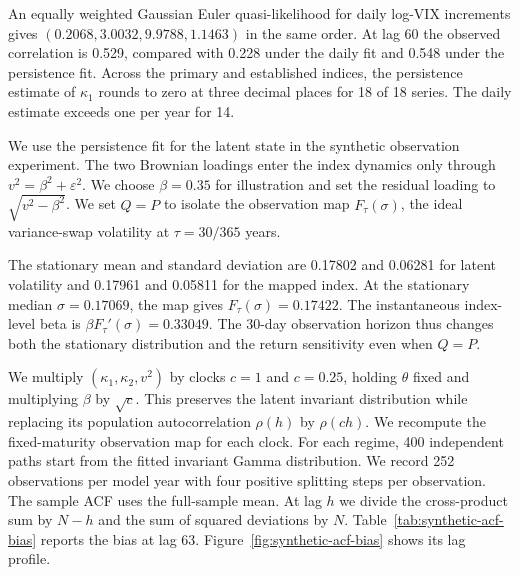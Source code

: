 An equally weighted Gaussian Euler quasi-likelihood for daily log-VIX increments
gives $(0.2068,3.0032,9.9788,1.1463)$ in the same order.
At lag 60 the observed correlation is 0.529, compared with 0.228
under the daily fit and 0.548 under the persistence fit.
Across the primary and established indices, the persistence estimate of $\kappa_1$ rounds to zero
at three decimal places for 18 of 18 series. The daily estimate exceeds one per year for 14.

We use the persistence fit for the latent state in the synthetic observation experiment.
The two Brownian loadings enter the index dynamics only through $v^2=\beta^2+\varepsilon^2$. We choose $\beta=0.35$
for illustration and set the residual loading to $\sqrt{v^2-\beta^2}$.
We set $Q=P$ to isolate the observation map $F_\tau(\sigma)$, the ideal
variance-swap volatility at $\tau=30/365$ years.

The stationary mean and standard deviation are 0.17802
and 0.06281 for latent volatility and 0.17961 and
0.05811 for the mapped index. At the stationary median
$\sigma=0.17069$, the map gives $F_\tau(\sigma)=0.17422$.
The instantaneous index-level beta is $\beta F_\tau'(\sigma)=0.33049$.
The 30-day observation horizon thus changes both the stationary distribution
and the return sensitivity even when $Q=P$.

We multiply $(\kappa_1,\kappa_2,v^2)$ by clocks $c=1$ and $c=0.25$,
holding $\theta$ fixed and multiplying $\beta$ by $\sqrt{c}$.
This preserves the latent invariant distribution while replacing its
population autocorrelation $\rho(h)$ by $\rho(ch)$.
We recompute the fixed-maturity observation map for each clock.
For each regime, 400 independent paths start from the fitted invariant Gamma distribution.
We record 252 observations per model year with four positive splitting steps per observation.
The sample ACF uses the full-sample mean. At lag $h$ we divide the cross-product
sum by $N-h$ and the sum of squared deviations by $N$.
Table~\ref{tab:synthetic-acf-bias} reports the bias at lag 63.
Figure~\ref{fig:synthetic-acf-bias} shows its lag profile.

